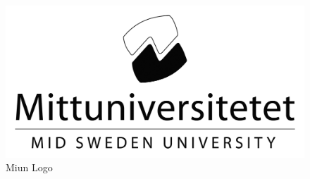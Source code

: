 \lipsum[1-2]


\begin{figure}[t]
\centering
  \includegraphics[width=0.8\linewidth]{figures/miun_bw_black.png}
  \caption{Miun Logo}
  \label{fig:MiunLogo}
\end{figure}





